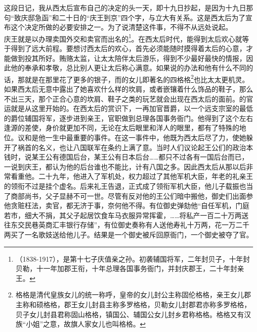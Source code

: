这段日记，我从西太后宣布自己的决定的头一天，即十九日抄起，是因为十九日那句“致庆邸急函”和二十日的“庆王到京”四个字，与立大有关系。这是西太后为了宣布这个决定所做的必要安排之一。为了说清楚这件事，不得不从远处说起。\\

庆王就是以办理卖国外交和卖官而出名的\footnote{（1838-1917），是第十七子庆值亲之孙。初袭辅国将军，二年封贝子，十年封贝勒，十一年加郡王衔，十年总理各国事务衙门，并封庆郡王，二十年封亲王。}。在西太后时代，能得到太后欢心就等于得到了远大前程。要想讨西太后的欢心，首先必须能随时摸得着太后的心意，才能做到投其所好。贿赂太监，让太太陪伴太后游乐，得到不少最好最快的情报，因此他的奉承和孝敬，总比别人更让太后称心满意。如果说的办法和他有什么不同的话，那就是在那里花了更多的银子，而的女儿即著名的四格格\footnote{格格是清代皇族女儿的统一称呼，皇帝的女儿封公主称固伦格格，亲王女儿郡主称和硕格格，郡王女儿封县主称多罗格格，贝勒女儿封郡君亦称多罗格格，贝子女儿封县君称固山格格，镇国公、辅国公女儿封乡君称格格。格格又有汉族“小姐”之意，故旗人家女儿也叫格格。}也比太太更机灵。如果西太后无意中露出了她喜欢什么样的坎肩，或者嵌镶着什么饰品的鞋子，那么不出三天，那个正合心意的坎肩、鞋子之类的玩艺就会出现在西太后的面前。的官运就是从这里开始的。在西太后的赏识下，一再加官晋爵，以一个远支宗室的最低的爵位辅国将军，逐步进到亲王，官职做到总理各国事务衙门。他得到了这个左右逢源的差使，身价就更加不同，无论在太后眼里和洋人的眼里，都有了特殊的地位。议和是他一生中最重要的事件。在这一事件中，他既为西太后尽了力，使她躲开了祸首的名义，也让八国联军在条约上满了意。当时人们议论起王公们的政治本钱时，说某王公有德国后台，某王公有日本后台……都只不过各有一国后台而已，一说到庆王，都认为他的后台谁也不能比，计有八国之多。因此西太后从那以后非常看重他。二十九年，他进入了军机处，权力超过了其他军机大臣，年老的礼亲王的领衔不过是挂个虚名。后来礼王告退，正式成了领衔军机大臣，他儿子载振也当了商部尚书，父子显赫不可一世。尽管有反对他的王公们暗中搬他，御史们出面参他贪赃枉法，卖官，都无济于事，奈何他不得。有位御史弹劾他“自任军机，门庭若市，细大不捐，其父子起居饮食车马衣服异常挥霍，……将私产一百二十万两送往东交民巷英商汇丰银行存储”，有位御史奏称有人送他寿礼十万两，花一万二千两买了一名歌妓送给他儿子。结果是一个御史被斥回原衙门，一个御史被夺了官。\\

